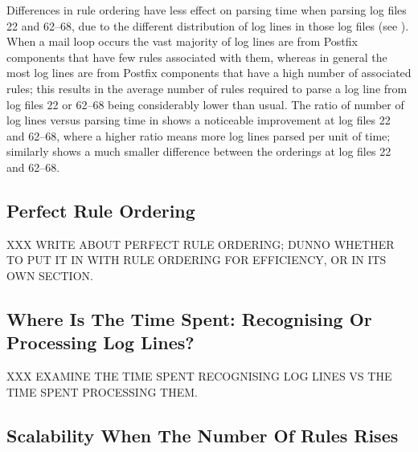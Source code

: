 

Differences in rule ordering have less effect on parsing time when parsing
log files 22 and 62--68, due to the different distribution of log lines in
those log files (see ).
When a mail loop occurs the vast majority of log lines are from Postfix
components that have few rules associated with them, whereas in general the
most log lines are from Postfix components that have a high number of
associated rules; this results in the average number of rules required to
parse a log line from log files 22 or 62--68 being considerably lower than
usual.  The ratio of number of log lines versus parsing time in
 shows a
noticeable improvement at log files 22 and 62--68, where a higher ratio
means more log lines parsed per unit of time; similarly  shows a much smaller difference
between the orderings at log files 22 and 62--68.

\subsection{Perfect Rule Ordering}

\label{perfect rule ordering}

XXX WRITE ABOUT PERFECT RULE ORDERING\@; DUNNO WHETHER TO PUT IT IN WITH
RULE ORDERING FOR EFFICIENCY, OR IN ITS OWN SECTION\@.

\subsection{Where Is The Time Spent: Recognising Or Processing Log Lines?}

\label{recognising vs processing}

XXX EXAMINE THE TIME SPENT RECOGNISING LOG LINES VS THE TIME SPENT
PROCESSING THEM\@.

\subsection{Scalability When The Number Of Rules Rises}

